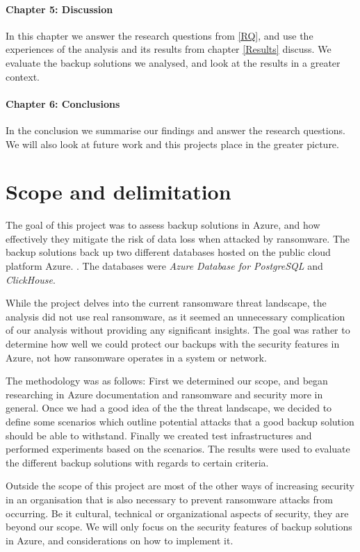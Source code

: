 \paragraph{Chapter 5: Discussion}
In this chapter we answer the research questions from \ref{RQ}, and use the experiences of the analysis and its results from chapter \ref{Results} discuss. We evaluate the backup solutions we analysed, and look at the results in a greater context. 

\paragraph{Chapter 6: Conclusions}
In the conclusion we summarise our findings and answer the research questions. We will also look at future work and this projects place in the greater picture.


\section{Scope and delimitation}
The goal of this project was to assess backup solutions in Azure, and how effectively they mitigate the risk of data loss when attacked by ransomware. The backup solutions back up two different databases hosted on the public cloud platform Azure. . The databases were \textit{Azure Database for PostgreSQL} and \textit{ClickHouse}.

While the project delves into the current ransomware threat landscape, the analysis did not use real ransomware, as it seemed an unnecessary complication of our analysis without providing any significant insights. The goal was rather to determine how well we could protect our backups with the security features in Azure, not how ransomware operates in a system or network. 

The methodology was as follows:
First we determined our scope,
and began researching in Azure documentation and ransomware and security more in general.
Once we had a good idea of the the threat landscape, we decided to define some 
scenarios which outline potential attacks that a good backup solution should be able to withstand.
Finally we created test infrastructures and performed experiments based on the scenarios.
The results were used to evaluate the different backup solutions with regards to certain criteria.

Outside the scope of this project are most of the other ways of increasing security in an organisation that is also necessary to prevent ransomware attacks from occurring. Be it cultural, technical or organizational aspects of security, they are beyond our scope. We will only focus on the security features of backup solutions in Azure, and considerations on how to implement it. 
